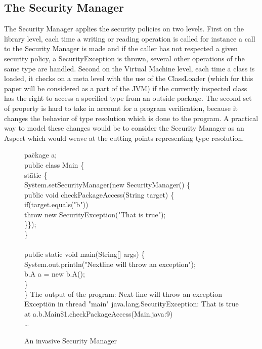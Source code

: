 \subsection{The Security Manager}
The Security Manager applies the security policies on two
levels. First on the library level, each time a writing or reading
operation is called for instance a call to the Security Manager is
made and if the caller has not respected a given security policy, a
SecurityException is thrown, several other operations of the same type
are handled. Second on the Virtual Machine level, each time a class is
loaded, it checks on a meta level with the use of the ClassLoader
(which for this paper will be considered as a part of the JVM) if the
currently inspected class has the right to access a specified type
from an outside package.  The second set of property is hard to take
in account for a program verification, because it changes the behavior
of type resolution which is done to the program.  A practical way to
model these changes would be to consider the Security Manager as an
Aspect which would weave at the cutting points representing type
resolution.
\begin{figure}
\bcode
pa\=ckage a;\\
public class Main \{\+\\
  st\=atic \{\+\\
    Sy\=stem.setSecurityManager(new SecurityManager() \{\+\\
      pu\=blic void checkPackageAccess(String target) \{\+\\
        if\=(target.equals("b"))\\
          \>throw new SecurityException("That is true");\\
      \}\});\-\-\\
  \}\\
 \\
  public static void main(String[] args) \{\+\\
    System.out.println("Nextline will throw an exception");\\
    b.A a = new b.A();\-\\
  \}\-\\
\}
\ecode
The output of the program:
\bcode
Next line will throw an exception\\
Excepti\=on in thread "main" java.lang.SecurityException: That is true\+\\
	at a.b.Main\$1.checkPackageAccess(Main.java:9)\\
	\dots
\ecode
\caption{An invasive Security Manager}
\end{figure}


